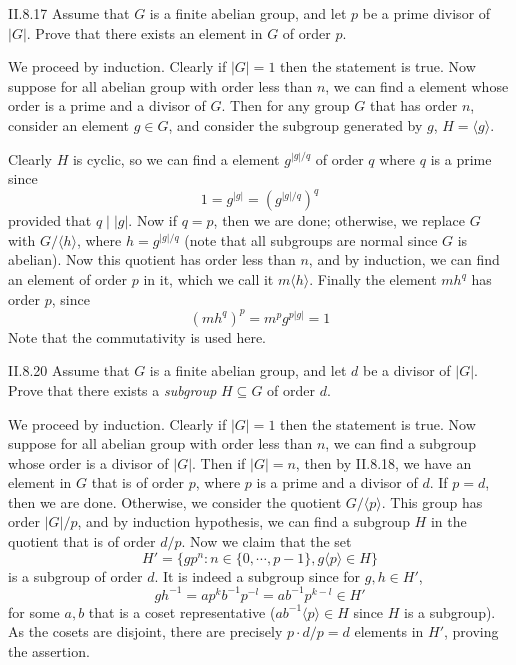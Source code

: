\begin{problem}{II.8.17}
Assume that $G$ is a finite abelian group, and let $p$ be a prime divisor of $|G|$. Prove that there exists an element in $G$ of order $p$.
\end{problem}
\begin{pf}
We proceed by induction. Clearly if $|G| = 1$ then the statement is true. Now suppose for all abelian group with order less than $n$, we can find a element whose order is a prime and a divisor of $G$. Then for any group $G$ that has order $n$, consider an element $g \in G$, and consider the subgroup generated by $g$, $H = \langle g \rangle$. 

Clearly $H$ is cyclic, so we can find a element $g^{|g|/ q}$ of order $q$ where $q$ is a prime since
\[
1 = g^{|g|} = (g^{|g|/ q})^q
\]
provided that $q\;|\;|g|$. Now if $q = p$, then we are done; otherwise, we replace $G$ with $G/\langle h \rangle$, where $h = g^{|g|/ q}$ (note that all subgroups are normal since $G$ is abelian). Now this quotient has order less than $n$, and by induction, we can find an element of order $p$ in it, which we call it $m\langle h \rangle$. Finally the element $mh^{q}$ has order $p$, since
\[
(mh^{q})^p = m^pg^{p|g|} = 1
\]
Note that the commutativity is used here.
\end{pf}

\begin{problem}{II.8.20}
Assume that $G$ is a finite abelian group, and let $d$ be a divisor of $|G|$. Prove that there exists a \textit{subgroup} $H \subseteq G$ of order $d$.
\end{problem}
\begin{pf}
We proceed by induction. Clearly if $|G| = 1$ then the statement is true. Now suppose for all abelian group with order less than $n$, we can find a subgroup whose order is a divisor of $|G|$. Then if $|G| = n$, then by II.8.18, we have an element in $G$ that is of order $p$, where $p$ is a prime and a divisor of $d$. If $p = d$, then we are done. Otherwise, we consider the quotient $G/\langle p \rangle$. This group has order $|G|/p$, and by induction hypothesis, we can find a subgroup $H$ in the quotient that is of order $d/p$. Now we claim that the set
\[
H' = \{ gp^n : n \in \{0, \cdots, p-1\}, g\langle p \rangle \in H \}
\]
is a subgroup of order $d$. It is indeed a subgroup since for $g, h \in H'$,
\[
gh^{-1} = ap^kb^{-1}p^{-l} = ab^{-1}p^{k-l} \in H'
\]
for some $a, b$ that is a coset representative ($ab^{-1}\langle p \rangle \in H$ since $H$ is a subgroup). As the cosets are disjoint, there are precisely $p \cdot d/p = d$ elements in $H'$, proving the assertion.
\end{pf}

